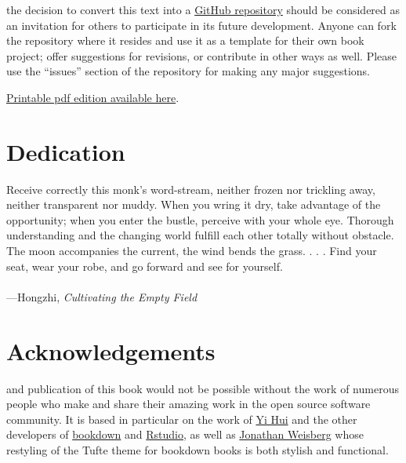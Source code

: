 \documentclass[justified]{tufte-book}
\newenvironment{epigraph}%
{
\begin{flushright}
\begin{minipage}{20em}
\begin{flushright}
\itshape
}%
{
\end{flushright}
\end{minipage}
\end{flushright}
}
\begin{document}
 the decision to convert this text into a \href{https://github.com/gwmatthews/ethics}{GitHub repository} should be considered as an invitation for others to participate in its future development. Anyone can fork the repository where it resides and use it as a template for their own book project; offer suggestions for revisions, or contribute in other ways as well. Please use the ``issues'' section of the repository for making any major suggestions.

\href{https://github.com/gwmatthews/ethics/raw/master/docs/_main.pdf}{Printable pdf edition available here}.

\hypertarget{dedication}{%
\section*{Dedication}\label{dedication}}

\begin{epigraph}
Receive correctly this monk's word-stream, neither frozen nor trickling
away, neither transparent nor muddy. When you wring it dry, take
advantage of the opportunity; when you enter the bustle, perceive with
your whole eye. Thorough understanding and the changing world fulfill
each other totally without obstacle. The moon accompanies the current,
the wind bends the grass. . . . Find your seat, wear your robe, and go
forward and see for yourself.\\
~\\
---Hongzhi, \emph{Cultivating the Empty Field}\\
\end{epigraph}

\hypertarget{acknowledgements}{%
\section*{Acknowledgements}\label{acknowledgements}}

 and publication of this book would not be possible without the work of numerous people who make and share their amazing work in the open source software community. It is based in particular on the work of \href{https://github.com/yihui}{Yi Hui} and the other developers of \href{https://github.com/rstudio/bookdown}{bookdown} and \href{https://rstudio.com/products/rstudio/}{Rstudio}, as well as \href{https://github.com/jweisber}{Jonathan Weisberg} whose restyling of the Tufte theme for bookdown books is both stylish and functional.
\end{document}

